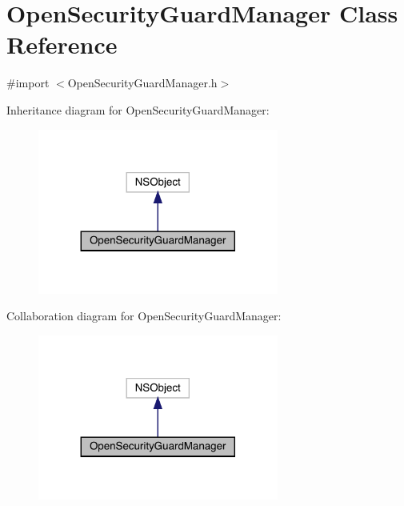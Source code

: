 \hypertarget{interface_open_security_guard_manager}{}\section{Open\+Security\+Guard\+Manager Class Reference}
\label{interface_open_security_guard_manager}


{\ttfamily \#import $<$Open\+Security\+Guard\+Manager.\+h$>$}



Inheritance diagram for Open\+Security\+Guard\+Manager\+:\nopagebreak
\begin{figure}[H]
\begin{center}
\leavevmode
\includegraphics[width=224pt]{interface_open_security_guard_manager__inherit__graph}
\end{center}
\end{figure}


Collaboration diagram for Open\+Security\+Guard\+Manager\+:\nopagebreak
\begin{figure}[H]
\begin{center}
\leavevmode
\includegraphics[width=224pt]{interface_open_security_guard_manager__coll__graph}
\end{center}
\end{figure}
